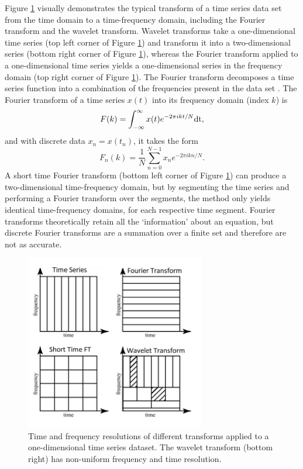 Figure \ref{fig:wavelet-diagram} visually demonstrates the typical transform of a time series data set from the time domain to a time-frequency domain, including the Fourier transform and the wavelet transform. Wavelet transforms take a one-dimensional time series (top left corner of Figure \ref{fig:wavelet-diagram}) and transform it into a two-dimensional series (bottom right corner of Figure \ref{fig:wavelet-diagram}), whereas the Fourier transform applied to a one-dimensional time series yields a one-dimensional series in the frequency domain (top right corner of Figure \ref{fig:wavelet-diagram}). The Fourier transform decomposes a time series function into a combination of the frequencies present in the data set \citep{Farge:1992}. The Fourier transform of a time series $x(t)$ into its frequency domain (index $k$) is
\begin{equation}
    F(k) = \int_{-\infty}^\infty x(t) e^{-2\pi ikt/N} \textnormal{dt},
    \label{eq:fourier}
\end{equation}
\noindent and with discrete data $x_n = x(t_n)$, it takes the form
\begin{equation}
    F_n(k) = \frac{1}{N} \sum_{n=0}^{N-1}x_{n} e^{-2\pi ikn/N}.
    \label{eq:DFT}
\end{equation}
A short time Fourier transform (bottom left corner of Figure \ref{fig:wavelet-diagram}) can produce a two-dimensional time-frequency domain, but by segmenting the time series and performing a Fourier transform over the segments, the method only yields identical time-frequency domains, for each respective time segment. Fourier transforms theoretically retain all the `information' about an equation, but discrete Fourier transforms are a summation over a finite set and therefore are not as accurate. 

\begin{figure}
    \centering
    \includegraphics[width=0.7\textwidth]{Figures/Comparisonoftransformations.jpeg}
    \caption[Time and frequency resolutions of different transforms]{Time and frequency resolutions of different transforms applied to a one-dimensional time series dataset. The wavelet transform (bottom right) has non-uniform frequency and time resolution.}
    \label{fig:wavelet-diagram}
\end{figure}


